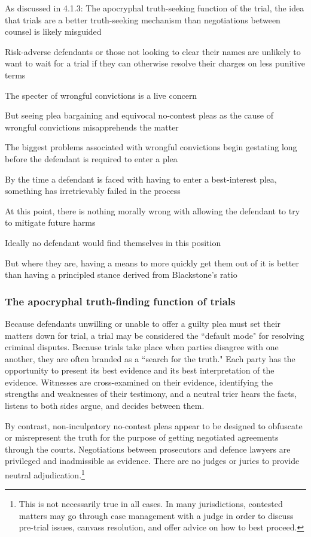 As discussed in 4.1.3: The apocryphal truth-seeking function of the trial, the idea that trials are a better truth-seeking mechanism than negotiations between counsel is likely misguided

Risk-adverse defendants or those not looking to clear their names are unlikely to want to wait for a trial if they can otherwise resolve their charges on less punitive terms

The specter of wrongful convictions is a live concern

But seeing plea bargaining and equivocal no-contest pleas as the cause of wrongful convictions misapprehends the matter

The biggest problems associated with wrongful convictions begin gestating long before the defendant is required to enter a plea

By the time a defendant is faced with having to enter a best-interest plea, something has irretrievably failed in the process

At this point, there is nothing morally wrong with allowing the defendant to try to mitigate future harms

Ideally no defendant would find themselves in this position

But where they are, having a means to more quickly get them out of it is better than having a principled stance derived from Blackstone's ratio

\subsubsection{The apocryphal truth-finding function of trials}

Because defendants unwilling or unable to offer a guilty plea must set their matters down for trial, a trial may be considered the ``default mode" for resolving criminal disputes. Because trials take place when parties disagree with one another, they are often branded as a ``search for the truth." Each party has the opportunity to present its best evidence and its best interpretation of the evidence. Witnesses are cross-examined on their evidence, identifying the strengths and weaknesses of their testimony, and a neutral trier hears the facts, listens to both sides argue, and decides between them.

By contrast, non-inculpatory no-contest pleas appear to be designed to obfuscate or misrepresent the truth for the purpose of getting negotiated agreements through the courts. Negotiations between prosecutors and defence lawyers are privileged and inadmissible as evidence. There are no judges or juries to provide neutral adjudication.\footnote{This is not necessarily true in all cases. In many jurisdictions, contested matters may go through case management with a judge in order to discuss pre-trial issues, canvass resolution, and offer advice on how to best proceed. }

